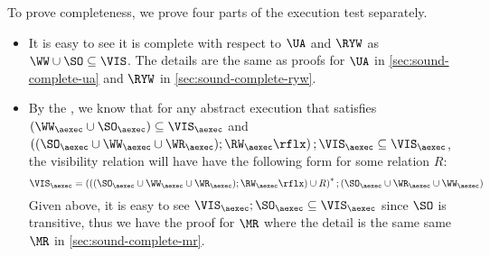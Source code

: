 To prove completeness, we prove four parts of the execution test separately.
\begin{itemize}
\item It is easy to see it is complete with respect to \( \UA \) and \( \RYW \) as \( \WW \cup \SO \subseteq \VIS \).
    The details are the same as proofs for \( \UA \) in \cref{sec:sound-complete-ua} and \( \RYW \) in \cref{sec:sound-complete-ryw}.

\item By the \cite{SIanalysis}, we know that for any abstract execution that satisfies \( (\WW_\aexec \cup \SO_\aexec) \subseteq \VIS_\aexec \)
and \( \left( (\SO_\aexec \cup \WW_\aexec \cup \WR_\aexec ) ; \RW_{\aexec}\rflx \right) ; \VIS_\aexec \subseteq \VIS_\aexec \),
the visibility relation will have have the following form for some relation \( R \):
\[
    \VIS_\aexec = \left( \left( (\SO_\aexec \cup \WW_\aexec \cup \WR_\aexec ) ; \RW_{\aexec}\rflx \right)  \cup R \right)^* ; (\SO_\aexec \cup \WR_\aexec \cup \WW_\aexec) 
\]
Given above, it is easy to see \( \VIS_\aexec ; \SO_\aexec \subseteq \VIS_\aexec \) since \( \SO \) is transitive, 
thus we have the proof for \( \MR \) where the detail is the same same \( \MR \) in \cref{sec:sound-complete-mr}.


\end{itemize}

